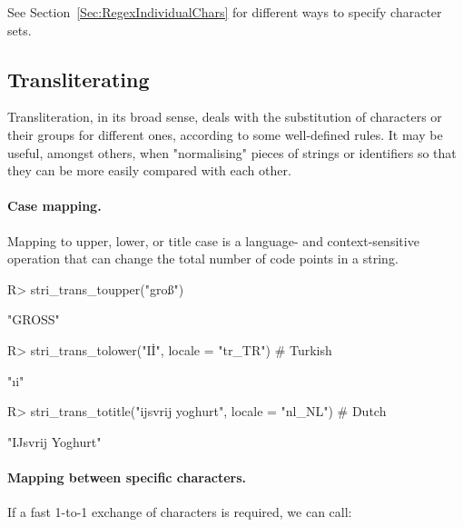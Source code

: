 \documentclass[nojss]{jss}
\begin{document}
See Section~\ref{Sec:RegexIndividualChars} for different ways
to specify character sets.





\subsection{Transliterating}

Transliteration, in its broad sense, deals with the substitution
of characters or their groups for different ones, according to some
well-defined rules. It may be useful, amongst others, when "normalising"
pieces of strings or identifiers so that they can be more easily
compared with each other.


\paragraph{Case mapping.}
Mapping to  upper, lower, or title case
is a language- and context-sensitive operation
that can change the total number of code points in a string.



\begin{Schunk}
\begin{Sinput}
R> stri_trans_toupper("groß")
\end{Sinput}
\begin{Soutput}
[1] "GROSS"
\end{Soutput}
\begin{Sinput}
R> stri_trans_tolower("Iİ", locale = "tr_TR")               # Turkish
\end{Sinput}
\begin{Soutput}
[1] "ıi"
\end{Soutput}
\begin{Sinput}
R> stri_trans_totitle("ijsvrij yoghurt", locale = "nl_NL")  # Dutch
\end{Sinput}
\begin{Soutput}
[1] "IJsvrij Yoghurt"
\end{Soutput}
\end{Schunk}





\paragraph{Mapping between specific characters.}
If a fast 1-to-1 exchange of characters is required, we can call:
\end{document}
